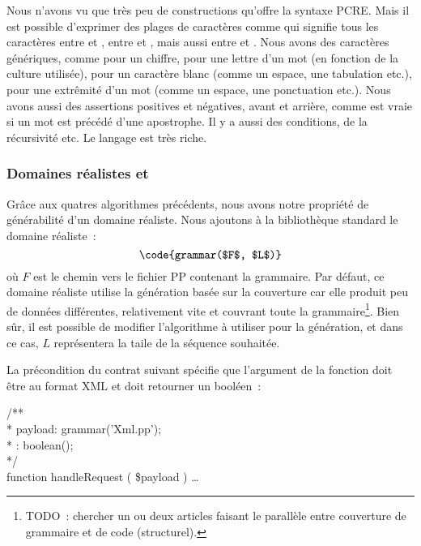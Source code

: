 Nous n'avons vu que très peu de constructions qu'offre la syntaxe PCRE. Mais il
est possible d'exprimer des plages de caractères comme \code{[a-zA-Z0-9]} qui
signifie tous les caractères entre  et , entre  et
, mais aussi entre  et . Nous avons des caractères
génériques, comme  pour un chiffre,  pour une
lettre d'un mot (en fonction de la culture utilisée),  pour un
caractère blanc (comme un espace, une tabulation etc.),  pour
une extrêmité d'un mot (comme un espace, une ponctuation etc.). Nous avons aussi
des assertions positives et négatives, avant et arrière, comme
 est vraie si un mot est précédé d'une apostrophe. Il
y a aussi des conditions, de la récursivité etc. Le langage est très riche.

\subsubsection{Domaines réalistes  et }

Grâce aux quatres algorithmes précédents, nous avons notre propriété de
générabilité d'un domaine réaliste. Nous ajoutons à la bibliothèque standard le
domaine réaliste~:
%
$$\code{grammar($F$, $L$)}$$
%
où $F$ est le chemin vers le fichier PP contenant la grammaire. Par défaut, ce
domaine réaliste utilise la génération basée sur la couverture car elle produit
peu de données différentes, relativement vite et couvrant toute la
grammaire\footnote{TODO~: chercher un ou deux articles faisant le parallèle
entre couverture de grammaire et de code (structurel).}. Bien sûr, il est
possible de modifier l'algorithme à utiliser pour la génération, et dans ce cas,
$L$ représentera la taile de la séquence souhaitée.

\begin{example}

La précondition du contrat suivant spécifie que l'argument  de
la fonction  doit être au format XML et doit retourner un
booléen~:

\begin{pre}
/** \\
 * \arequires payload: grammar('Xml.pp'); \\
 * \aensures  \aresult: boolean(); \\
 */ \\
function handleRequest ( \$payload ) { … }
\end{pre}

\end{example}

